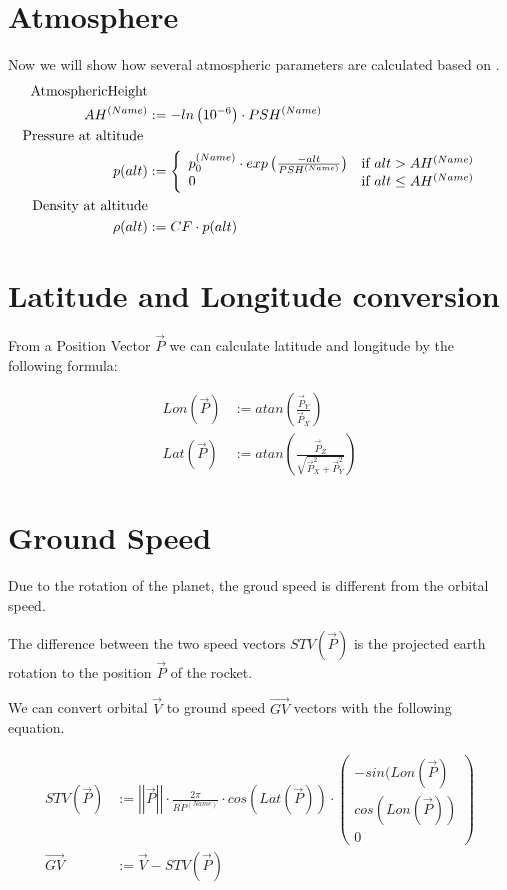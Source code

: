 \documentclass[11pt]{article}
\newcommand{\oa}[1]{\overrightarrow{#1}}
\newcommand{\Pos}{\oa{P}}
\newcommand{\Vel}{\oa{V}}
\newcommand{\absvec}[1]{\left|\left|{#1}\right|\right|}
\begin{document}
\section{Atmosphere}

Now we will show how several atmospheric parameters are calculated
based on \cite{Atmo}.
\begin{align}
  \textrm{AtmosphericHeight}\nonumber\\
  AH^{(Name)} &:= -ln\left(10^{-6}\right)\cdot PSH^{(Name)}\\
  \textrm{Pressure at altitude }&\nonumber\\
  p(alt) &:=
  \left\{
      \begin{array}{l l}
        p_0^{(Name)} \cdot exp\left({\frac{-alt}{PSH^{(Name)}}}\right) & \textrm{if } alt > AH^{(Name)}\\
        0 &\textrm{if } alt \leq AH^{(Name)}
      \end{array}
    \right.\\
    \textrm{Density at altitude}\nonumber\\
    \rho(alt) &:= CF \cdot p(alt)
\end{align}

\section{Latitude and Longitude conversion}

From a Position Vector $\Pos$ we can calculate latitude
and longitude by the following formula:

\begin{align}
  Lon(\Pos) &:= atan\left(\frac{\Pos_Y}{\Pos_X}\right)\\
  Lat(\Pos) &:= atan\left(\frac{\Pos_Z}{\sqrt{\Pos_X^2+\Pos_Y^2}}\right)
\end{align}

\section{Ground Speed}

Due to the rotation of the planet, the groud speed is different from
the orbital speed.

The difference between the two speed vectors $STV(\Pos)$ is the
projected earth rotation to the position $\Pos$ of the rocket.

We can convert orbital $\Vel$ to ground speed $\oa{GV}$
vectors with the following equation.

\begin{align}
  STV(\Pos) &:= \absvec{\Pos} \cdot \frac{2 \pi}{RP^{(Name)}} \cdot cos\left(Lat\left(\Pos\right)\right)\cdot\left(\begin{smallmatrix}-sin(Lon(\Pos)\\cos(Lon(\Pos))\\0\end{smallmatrix}\right)\\
  \oa{GV} &:= \Vel - STV(\Pos)
\end{align}
\end{document}
